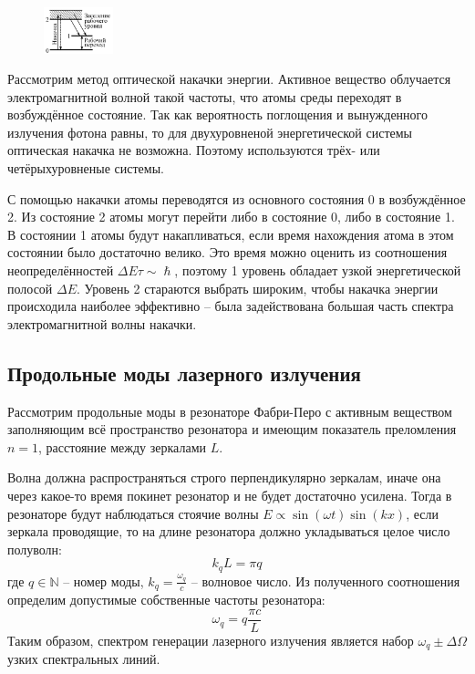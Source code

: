 \begin{figure}
	\centering
	\includegraphics[width=0.18\textwidth]{../Изображения/Накачка.png}
\end{figure}

Рассмотрим метод оптической накачки энергии. Активное вещество облучается 
электромагнитной волной такой частоты, что атомы среды переходят в возбуждённое 
состояние. Так как вероятность поглощения и вынужденного излучения фотона 
равны, то для двухуровненой энергетической системы оптическая накачка не 
возможна. Поэтому используются трёх- или четёрыхуровненые системы.

С помощью накачки атомы переводятся из основного состояния 0 в возбуждённое 2. 
Из состояние 2 атомы могут перейти либо в состояние 0, либо в состояние 1. В 
состоянии 1 атомы будут накапливаться, если время нахождения атома в этом 
состоянии было достаточно велико. Это время можно оценить из соотношения 
неопределённостей $\Delta E \tau \sim \hslash$, поэтому 1 уровень обладает 
узкой энергетической полосой $\Delta E$. Уровень 2 стараются выбрать широким, 
чтобы накачка энергии происходила наиболее эффективно -- была задействована 
большая часть спектра электромагнитной волны накачки.

\subsection*{Продольные моды лазерного излучения}

Рассмотрим продольные моды в резонаторе Фабри-Перо с активным веществом 
заполняющим всё пространство резонатора и имеющим показатель преломления $n = 
1$, расстояние между зеркалами $L$.

Волна должна распространяться строго перпендикулярно зеркалам, иначе она через 
какое-то время покинет резонатор и не будет достаточно усилена. Тогда в 
резонаторе будут наблюдаться стоячие волны $E \propto \sin(\omega t) \sin 
(kx)$, если зеркала проводящие, то на длине резонатора должно укладываться 
целое число полуволн:
$$
k_q L = \pi q
$$
где $q \in \mathbb{N}$ -- номер моды, $k_q = \frac{\omega_q}{c}$ -- волновое 
число. Из полученного соотношения определим допустимые собственные частоты 
резонатора:
$$
\omega_q = q \frac{\pi c}{L}
$$
Таким образом, спектром генерации лазерного излучения является набор $\omega_q 
\pm \Delta \Omega$ узких спектральных линий.

